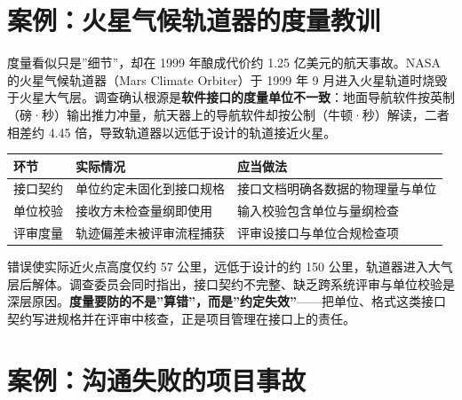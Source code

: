 \documentclass[12pt,a4paper,twoside,openany]{ctexbook}
\numberwithin{figure}{chapter}
\numberwithin{table}{chapter}
\newcounter{none}
\begin{document}
\section{案例：火星气候轨道器的度量教训}\label{ux6848ux4f8bux706bux661fux6c14ux5019ux8f68ux9053ux5668ux7684ux5ea6ux91cfux6559ux8bad}

度量看似只是''细节''，却在 1999 年酿成代价约 1.25 亿美元的航天事故。NASA
的火星气候轨道器（Mars Climate Orbiter）于 1999 年 9
月进入火星轨道时烧毁于火星大气层。调查确认根源是\textbf{软件接口的度量单位不一致}：地面导航软件按英制（磅·秒）输出推力冲量，航天器上的导航软件却按公制（牛顿·秒）解读，二者相差约
4.45 倍，导致轨道器以远低于设计的轨道接近火星。

{\def\LTcaptype{none} %
\begin{longtable}[]{@{}
  >{\raggedright\arraybackslash}p{}
  >{\raggedright\arraybackslash}p{}
  >{\raggedright\arraybackslash}p{}@{}}
\toprule\noalign{}
\begin{minipage}[b]{\linewidth}\raggedright
环节
\end{minipage} & \begin{minipage}[b]{\linewidth}\raggedright
实际情况
\end{minipage} & \begin{minipage}[b]{\linewidth}\raggedright
应当做法
\end{minipage} \\
\midrule\noalign{}
\endhead
\bottomrule\noalign{}
\endlastfoot
接口契约 & 单位约定未固化到接口规格 &
接口文档明确各数据的物理量与单位 \\
单位校验 & 接收方未检查量纲即使用 & 输入校验包含单位与量纲检查 \\
评审度量 & 轨迹偏差未被评审流程捕获 & 评审设接口与单位合规检查项 \\
\end{longtable}
}

错误使实际近火点高度仅约 57 公里，远低于设计的约 150
公里，轨道器进入大气层后解体。调查委员会同时指出，接口契约不完整、缺乏跨系统评审与单位校验是深层原因。\textbf{度量要防的不是''算错''，而是''约定失效''}------把单位、格式这类接口契约写进规格并在评审中核查，正是项目管理在接口上的责任。

\section{案例：沟通失败的项目事故}\label{ux6848ux4f8bux6c9fux901aux5931ux8d25ux7684ux9879ux76eeux4e8bux6545}
\end{document}
